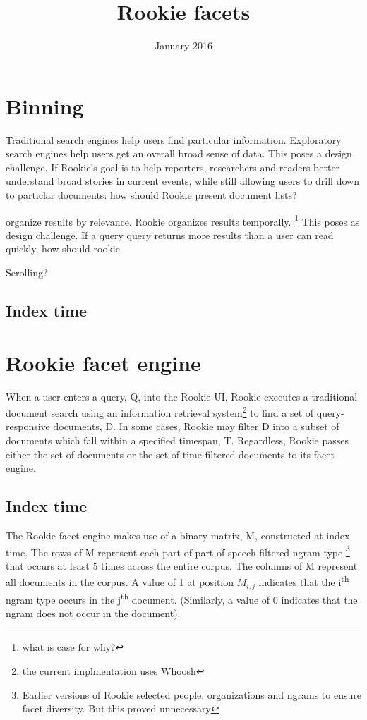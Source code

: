 \documentclass{article}
\title{Rookie facets}
\author{}
\date{January 2016}
\begin{document}
\maketitle

\section{Binning}

Traditional search engines help users find particular information. Exploratory search engines help users get an overall broad sense of data. This poses a design challenge. If Rookie's goal is to help reporters, researchers and readers better understand broad stories in current events, while still allowing users to drill down to particlar documents: how should Rookie present document lists?

organize results by relevance. Rookie organizes results temporally. \footnote{what is case for why?} This poses as design challenge. If a query query returns more results than a user can read quickly, how should rookie 

Scrolling?


\subsection{Index time}



\section{Rookie facet engine}

When a user enters a query, Q, into the Rookie UI, Rookie executes a traditional document search using an information retrieval system\footnote {the current implmentation uses Whoosh} to find a set of query-responsive documents, D. In some cases, Rookie may filter D into a subset of documents which fall within a specified timespan, T. Regardless, Rookie passes either the set of documents or the set of time-filtered documents to its facet engine.

\subsection{Index time}

The Rookie facet engine makes use of a binary matrix, M, constructed at index time. The rows of M represent each part of part-of-speech filtered ngram type \footnote{Earlier versions of Rookie selected people, organizations and ngrams to ensure facet diversity. But this proved unnecessary} that occurs at least 5 times across the entire corpus. The columns of M represent all documents in the corpus. A value of 1 at position $M_{i,j}$ indicates that the i\textsuperscript{th} ngram type occurs in the j\textsuperscript{th} document. (Similarly, a value of 0 indicates that the ngram does not occur in the document).
\end{document}
